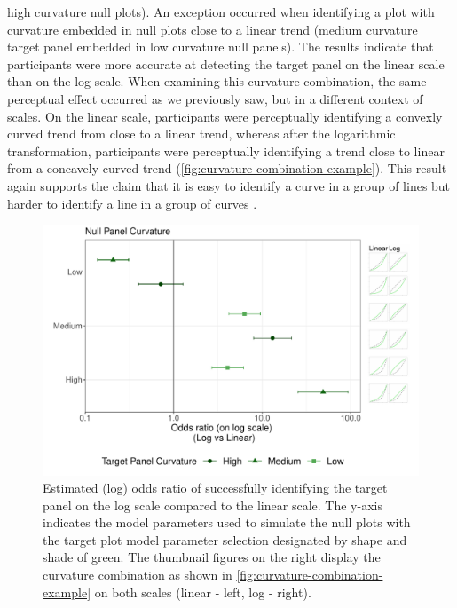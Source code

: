 \documentclass[12pt]{article}
\begin{document}
high curvature null plots). An exception occurred when identifying a
plot with curvature embedded in null plots close to a linear trend
(medium curvature target panel embedded in low curvature null panels).
The results indicate that participants were more accurate at detecting
the target panel on the linear scale than on the log scale. When
examining this curvature combination, the same perceptual effect
occurred as we previously saw, but in a different context of scales. On
the linear scale, participants were perceptually identifying a convexly
curved trend from close to a linear trend, whereas after the logarithmic
transformation, participants were perceptually identifying a trend close
to linear from a concavely curved trend
(\cref{fig:curvature-combination-example}). This result again supports
the claim that it is easy to identify a curve in a group of lines but
harder to identify a line in a group of curves
\citep{best_perception_2007}.

\begin{figure}[tbp]

{\centering \includegraphics[width=\linewidth,]{logarithmic-lineups-revisions_files/figure-latex/odds-ratio-plot-1} 

}

\caption[Lineups log(odds) results]{Estimated (log) odds ratio of successfully identifying the target panel on the log scale compared to the linear scale. The y-axis indicates the model parameters used to simulate the null plots with the target plot model parameter selection designated by shape and shade of green. The thumbnail figures on the right display the curvature combination as shown in \cref{fig:curvature-combination-example} on both scales (linear - left, log - right).}\label{fig:odds-ratio-plot}
\end{figure}
\end{document}
